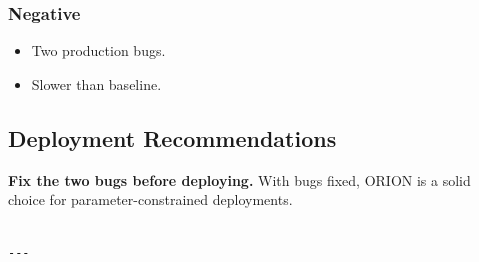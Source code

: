 \subsubsection{Negative}

\begin{itemize}
\item Two production bugs.
\item Slower than baseline.

\end{itemize}
\subsection{Deployment Recommendations}

\textbf{Fix the two bugs before deploying.} With bugs fixed, ORION is a solid 
choice for parameter-constrained deployments.
\begin{lstlisting}

---
\end{lstlisting}